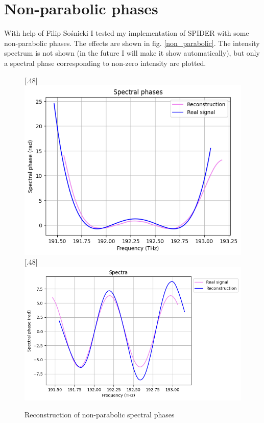 \documentclass{article}
\begin{document}
\pagebreak

\section{Non-parabolic phases}

With help of Filip Sośnicki I tested my implementation of SPIDER with some non-parabolic phases. The effects are shown in fig. \ref{non_parabolic}. The intensity spectrum is not shown (in the future I will make it show automatically), but only a spectral phase corresponding to non-zero intensity are plotted.

\begin{figure}[H]

\caption{Reconstruction of non-parabolic spectral phases}
[.48\linewidth]{%
\includegraphics[width=\linewidth]{non_parabolic_1}%
}
\hfill
{}[.48\linewidth]{%
\includegraphics[width=\linewidth]{non_parabolic_2}%
}
\end{figure}
\end{document}
